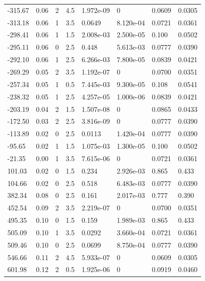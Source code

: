 \documentclass[preview]{standalone}
\begin{document}
{{\begin{tabular}{L{1.2cm}C{1.2cm} C{0.3cm}C{0.5cm} C{1.4cm}C{1.4cm} C{1.4cm}C{1.4cm}}
  -315.67  &  0.06  & 2     & 4.5 &  1.972e-09  & 0  & 0.0609 &  0.0305   \\ 
  -313.18  &  0.06  & 1     & 3.5 &  0.0649  & 8.120e-04  & 0.0721 &  0.0361   \\ 
  -298.41  &  0.06  & 1     & 1.5 &  2.008e-03  & 2.500e-05  & 0.100 &  0.0502   \\ 
  -295.11  &  0.06  & 0     & 2.5 &  0.448  & 5.613e-03  & 0.0777 &  0.0390   \\ 
  -292.10  &  0.06  & 1     & 2.5 &  6.266e-03  & 7.800e-05  & 0.0839 &  0.0421   \\ 
  -269.29  &  0.05  & 2     & 3.5 &  1.192e-07  & 0  & 0.0700 &  0.0351   \\ 
  -257.34  &  0.05  & 1     & 0.5 &  7.445e-03  & 9.300e-05  & 0.108 &  0.0541   \\ 
  -238.32  &  0.05  & 1     & 2.5 &  4.257e-05  & 1.000e-06  & 0.0839 &  0.0421   \\ 
  -203.19  &  0.04  & 2     & 1.5 &  1.507e-08  & 0  & 0.0865 &  0.0433   \\ 
  -172.50  &  0.03  & 2     & 2.5 &  3.816e-09  & 0  & 0.0777 &  0.0390   \\ 
  -113.89  &  0.02  & 0     & 2.5 &  0.0113  & 1.420e-04  & 0.0777 &  0.0390   \\ 
  -95.65  &  0.02  & 1     & 1.5 &  1.075e-03  & 1.300e-05  & 0.100 &  0.0502   \\ 
  -21.35  &  0.00  & 1     & 3.5 &  7.615e-06  & 0  & 0.0721 &  0.0361   \\ 
  101.03  &  0.02  & 0     & 1.5 &  0.234  & 2.926e-03  & 0.865 &  0.433   \\ 
  104.66  &  0.02  & 0     & 2.5 &  0.518  & 6.483e-03  & 0.0777 &  0.0390   \\ 
  382.34  &  0.08  & 0     & 2.5 &  0.161  & 2.017e-03  & 0.777 &  0.390   \\ 
  452.54  &  0.09  & 2     & 3.5 &  2.219e-07  & 0  & 0.0700 &  0.0351   \\ 
  495.35  &  0.10  & 0     & 1.5 &  0.159  & 1.989e-03  & 0.865 &  0.433   \\ 
  505.09  &  0.10  & 1     & 3.5 &  0.0292  & 3.660e-04  & 0.0721 &  0.0361   \\ 
  509.46  &  0.10  & 0     & 2.5 &  0.0699  & 8.750e-04  & 0.0777 &  0.0390   \\ 
  546.66  &  0.11  & 2     & 4.5 &  5.933e-07  & 0  & 0.0609 &  0.0305   \\ 
  601.98  &  0.12  & 2     & 0.5 &  1.925e-06  & 0  & 0.0919 &  0.0460   \\ 

\end{tabular}}}
\end{document}
